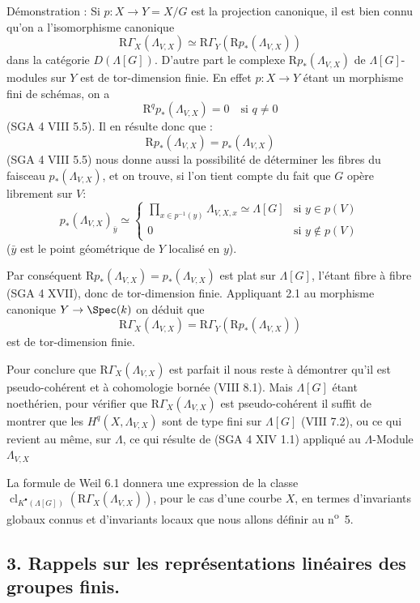 Démonstration : Si $p:X\to Y=X/G$ est la projection canonique, il est bien connu qu'on a l'isomorphisme canonique
\[
\mathrm{R}\Gamma_X(\Lambda_{V,X})\simeq \mathrm{R}\Gamma_Y(\mathrm{R}p_*(\Lambda_{V,X}))
\]
dans la catégorie $D(\Lambda[G])$. D'autre part le complexe $\mathrm{R}p_*(\Lambda_{V,X})$ de $\Lambda[G]$-modules sur $Y$ est de tor-dimension finie. En effet $p:X\to Y$ étant un morphisme fini de schémas, on a
\[
\mathrm{R}^q p_*(\Lambda_{V,X})=0\quad\text{si }q\ne0
\]
(SGA 4 VIII 5.5). Il en résulte donc que :
\[
\mathrm{R} p_*(\Lambda_{V,X})=p_*(\Lambda_{V,X})
\]
(SGA 4
VIII 5.5) nous donne aussi la possibilité de déterminer les fibres du faisceau $p_*(\Lambda_{V,X})$, et on trouve, si l'on tient compte du fait que $G$ opère librement sur $V$:
\[
p_*(\Lambda_{V,X})_{\bar y}\simeq
\begin{cases}
\displaystyle \prod_{x\in p^{-1}(y)}\Lambda_{V,X,x}\simeq \Lambda[G]& \text{si } y\in p(V)\\[1em]
0& \text{si } y\notin p(V)
\end{cases}
\]
($\bar y$ est le point géométrique de $Y$ localisé en $y$).

Par conséquent $\mathrm{R} p_*(\Lambda_{V,X})=p_*(\Lambda_{V,X})$ est plat sur $\Lambda[G]$, l'étant fibre à fibre (SGA 4 XVII), donc de tor-dimension finie. Appliquant 2.1 au morphisme canonique $Y\to\Spec(k)$ on déduit que
\[
\mathrm{R}\Gamma_X(\Lambda_{V,X})=\mathrm{R}\Gamma_Y(\mathrm{R}p_*(\Lambda_{V,X}))
\]
est de tor-dimension finie.

Pour conclure que $\mathrm{R}\Gamma_X(\Lambda_{V,X})$ est parfait il nous reste à démontrer qu'il est pseudo-cohérent et à cohomologie bornée (VIII 8.1). Mais $\Lambda[G]$ étant noethérien, pour vérifier que $\mathrm{R}\Gamma_X(\Lambda_{V,X})$ est pseudo-cohérent il suffit de montrer que les $H^q(X,\Lambda_{V,X})$ sont de type fini sur $\Lambda[G]$ (VIII 7.2), ou ce qui revient au même, sur $\Lambda$, ce qui résulte de (SGA 4 XIV 1.1) appliqué au $\Lambda$-Module $\Lambda_{V,X}$

La formule de Weil 6.1 donnera une expression de la classe $\operatorname{cl}_{K^\bullet(\Lambda[G])}(\mathrm{R}\Gamma_X(\Lambda_{V,X}))$, pour le cas d'une courbe $X$, en termes d'invariants globaux connus et d'invariants locaux que nous allons définir au n\textsuperscript{o}~5.

\subsection*{3. Rappels sur les représentations linéaires des groupes finis.}

